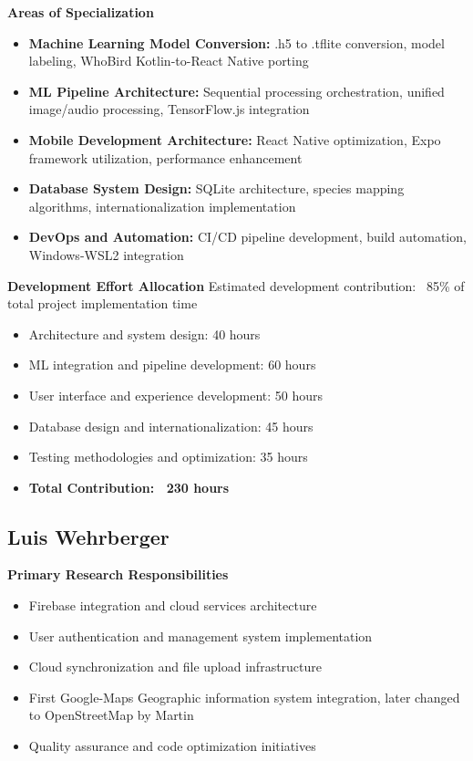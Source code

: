 \textbf{Areas of Specialization}
\begin{itemize}
    \item \textbf{Machine Learning Model Conversion:} .h5 to .tflite conversion, model labeling, WhoBird Kotlin-to-React Native porting
    \item \textbf{ML Pipeline Architecture:} Sequential processing orchestration, unified image/audio processing, TensorFlow.js integration
    \item \textbf{Mobile Development Architecture:} React Native optimization, Expo framework utilization, performance enhancement
    \item \textbf{Database System Design:} SQLite architecture, species mapping algorithms, internationalization implementation
    \item \textbf{DevOps and Automation:} CI/CD pipeline development, build automation, Windows-WSL2 integration
\end{itemize}

\textbf{Development Effort Allocation}
Estimated development contribution: ~85\% of total project implementation time
\begin{itemize}
    \item Architecture and system design: 40 hours
    \item ML integration and pipeline development: 60 hours
    \item User interface and experience development: 50 hours
    \item Database design and internationalization: 45 hours
    \item Testing methodologies and optimization: 35 hours
    \item \textbf{Total Contribution: ~230 hours}
\end{itemize}

\subsection{Luis Wehrberger}

\textbf{Primary Research Responsibilities}
\begin{itemize}
    \item Firebase integration and cloud services architecture
    \item User authentication and management system implementation
    \item Cloud synchronization and file upload infrastructure
    \item First Google-Maps Geographic information system integration, later changed to OpenStreetMap by Martin
    \item Quality assurance and code optimization initiatives
\end{itemize}

